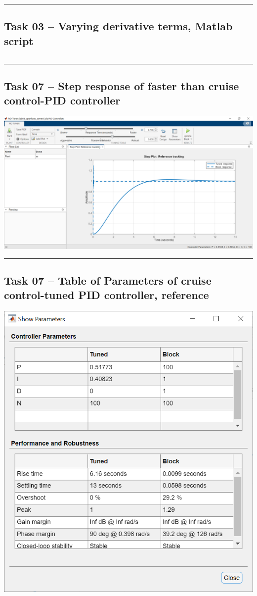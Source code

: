 \documentclass[12pt]{article}
\def\hr{{\par\noindent\rule{\textwidth}{0.4pt}}}
\begin{document}
\hr{}

\subsection{Task 03 -- Varying derivative terms, Matlab script}\label{sap:vary d}
\inputminted{matlab}{src/lab09_task03_vary_d.m}

\hr{}

\subsection{Task 07 -- Step response of faster than cruise control-PID controller}\label{sap:faster than cruise, step response}
\includegraphics[width=\linewidth]{img/task07_025_cruise_control_faster.png}

\hr{}

\subsection{Task 07 -- Table of Parameters of cruise control-tuned PID controller, reference}\label{sap:tuned PID parameters reference table}
\includegraphics[width=\linewidth]{img/task07_030_cruise_control_table.png}
\end{document}
